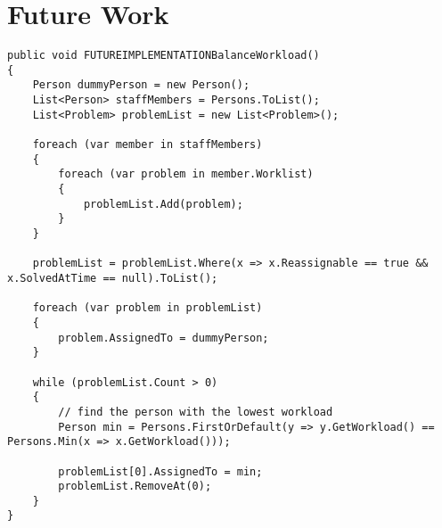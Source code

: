 \chapter{Future Work}
\label{chap:future_work}


\begin{lstlisting}[style=sourceCode, caption=\myCaption{A code snippet of random shizzle...}, label=lst:balanceWorkload]
public void FUTUREIMPLEMENTATIONBalanceWorkload()
{
    Person dummyPerson = new Person();
    List<Person> staffMembers = Persons.ToList();
    List<Problem> problemList = new List<Problem>();

    foreach (var member in staffMembers)
    {
        foreach (var problem in member.Worklist)
        {
            problemList.Add(problem);
        }
    }

    problemList = problemList.Where(x => x.Reassignable == true && x.SolvedAtTime == null).ToList();

    foreach (var problem in problemList)
    {
        problem.AssignedTo = dummyPerson;
    }

    while (problemList.Count > 0)
    {
        // find the person with the lowest workload
        Person min = Persons.FirstOrDefault(y => y.GetWorkload() == Persons.Min(x => x.GetWorkload()));

        problemList[0].AssignedTo = min;
        problemList.RemoveAt(0);
    }
}
\end{lstlisting}






